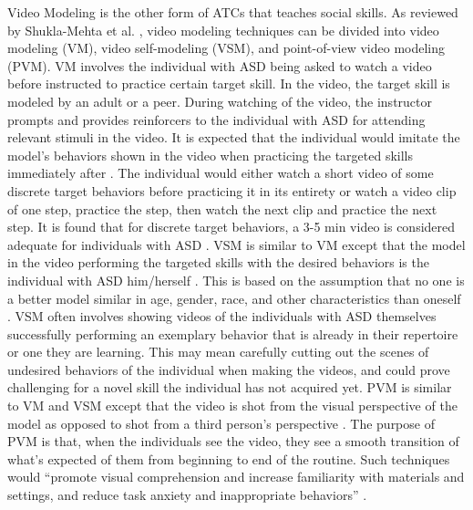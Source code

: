 \documentclass{ut-thesis}
\begin{document}
Video Modeling is the other form of ATCs that teaches social skills.  As reviewed by Shukla-Mehta et al. \cite{shukla2009evaluating}, video modeling techniques can be divided into video modeling (VM), video self-modeling (VSM), and point-of-view video modeling (PVM).  VM involves the individual with ASD being asked to watch a video before instructed to practice certain target skill.  In the video, the target skill is modeled by an adult or a peer.  During watching of the video, the instructor prompts and provides reinforcers to the individual with ASD for attending relevant stimuli in the video.  It is expected that the individual would imitate the model's behaviors shown in the video when practicing the targeted skills immediately after \cite{bellini2007meta, graetz2006show}.  The individual would either watch a short video of some discrete target behaviors before practicing it in its entirety or watch a video clip of one step, practice the step, then watch the next clip and practice the next step.  It is found that for discrete target behaviors, a 3-5 min video is considered adequate for individuals with ASD \cite{buggey2005video}.  VSM is similar to VM except that the model in the video performing the targeted skills with the desired behaviors is the individual with ASD him/herself \cite{hitchcock2003video}.  This is based on the assumption that no one is a better model similar in age, gender, race, and other characteristics than oneself \cite{bandura1969principles, buggey1999training}.  VSM often involves showing videos of the individuals with ASD themselves successfully performing an exemplary behavior that is already in their repertoire or one they are learning.  This may mean carefully cutting out the scenes of undesired behaviors of the individual when making the videos, and could prove challenging for a novel skill the individual has not acquired yet.  PVM is similar to VM and VSM except that the video is shot from the visual perspective of the model as opposed to shot from a third person's perspective \cite{hine2006using}.  The purpose of PVM is that, when the individuals see the video, they see a smooth transition of what's expected of them from beginning to end of the routine.  Such techniques would ``promote visual comprehension and increase familiarity with materials and settings, and reduce task anxiety and inappropriate behaviors'' \cite{shukla2009evaluating}.
\end{document}
